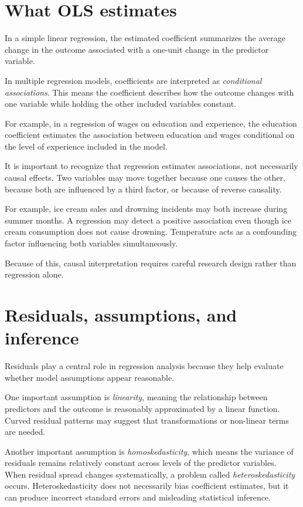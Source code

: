 \documentclass[
  11pt,
  oneside]{book}
\begin{document}
\section{What OLS estimates}\label{what-ols-estimates}

In a simple linear regression, the estimated coefficient summarizes the average change in the outcome associated with a one-unit change in the predictor variable.

In multiple regression models, coefficients are interpreted as \emph{conditional associations}. This means the coefficient describes how the outcome changes with one variable while holding the other included variables constant.

For example, in a regression of wages on education and experience, the education coefficient estimates the association between education and wages conditional on the level of experience included in the model.

It is important to recognize that regression estimates associations, not necessarily causal effects. Two variables may move together because one causes the other, because both are influenced by a third factor, or because of reverse causality.

For example, ice cream sales and drowning incidents may both increase during summer months. A regression may detect a positive association even though ice cream consumption does not cause drowning. Temperature acts as a confounding factor influencing both variables simultaneously.

Because of this, causal interpretation requires careful research design rather than regression alone.

\section{Residuals, assumptions, and inference}\label{residuals-assumptions-and-inference}

Residuals play a central role in regression analysis because they help evaluate whether model assumptions appear reasonable.

One important assumption is \emph{linearity}, meaning the relationship between predictors and the outcome is reasonably approximated by a linear function. Curved residual patterns may suggest that transformations or non-linear terms are needed.

Another important assumption is \emph{homoskedasticity}, which means the variance of residuals remains relatively constant across levels of the predictor variables. When residual spread changes systematically, a problem called \emph{heteroskedasticity} occurs. Heteroskedasticity does not necessarily bias coefficient estimates, but it can produce incorrect standard errors and misleading statistical inference.
\end{document}
